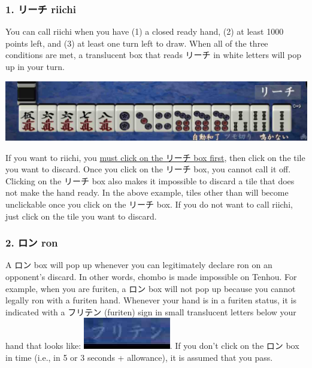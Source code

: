 \subsubsection{1. リーチ riichi } 
You can call riichi when you have (1) a closed ready hand, (2) at least 1000 points left, and (3) at least one turn left to draw. When all of the three conditions are met, a translucent box that reads リーチ in white letters will pop up in your turn. 
\begin{center}
\includegraphics[width=.7\textwidth,clip]{figs/riichi.jpg}
\end{center}
If you want to riichi, you \underline{must click on the リーチ box first}, then click on the tile you want to discard. Once you click on the リーチ box, you cannot call it off. Clicking on the リーチ box also makes it impossible to discard a tile that does not make the hand ready. In the above example, tiles other than {\LARGE {}} will become unclickable once you click on the リーチ box. If you do not want to call riichi, just click on the tile you want to discard. 

\subsubsection{2. ロン {\jap ron} \textipa{[r\'\textopeno\ng]}}
A ロン box will pop up whenever you can legitimately declare {\jap ron} on an opponent's discard. In other words, {\jap chombo} is made impossible on {\jap Tenhou}. For example, when you are {\jap furiten}, a ロン box will not pop up because you cannot legally {\jap ron} with a {\jap furiten} hand. Whenever your hand is in a {\jap furiten} status, it is indicated with a フリテン ({\jap furiten}) sign in small translucent letters below your hand that looks like: \includegraphics[width=.12\textwidth,clip]{figs/furiten.jpg}.
If you don't click on the ロン box in time (i.e., in 5 or 3 seconds + allowance), it is assumed that you pass. 

